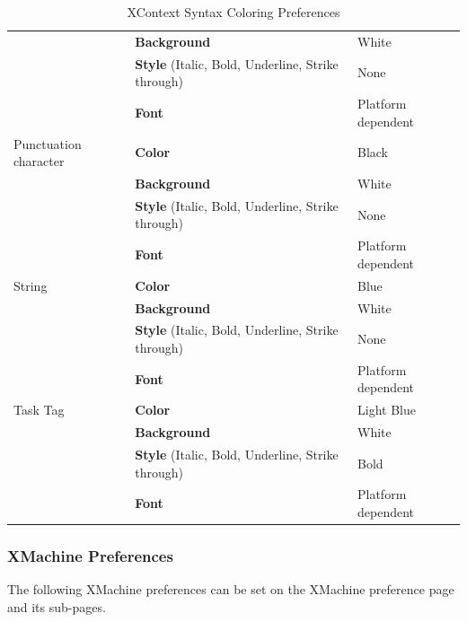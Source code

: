 \begin{table}[!htbp]
\begin{tabular}{|p{}|p{}|p{}|}
                                         & \textbf{Background} & White \\
                                         & \textbf{Style} (Italic, Bold, Underline, Strike through) & None \\
                                         & \textbf{Font} & Platform dependent \\
    \hline
    Punctuation character & \textbf{Color} & Black \\
                                         & \textbf{Background} & White \\
                                         & \textbf{Style} (Italic, Bold, Underline, Strike through) & None \\
                                         & \textbf{Font} & Platform dependent \\
    \hline
    String & \textbf{Color} & Blue \\
                                         & \textbf{Background} & White \\
                                         & \textbf{Style} (Italic, Bold, Underline, Strike through) & None \\
                                         & \textbf{Font} & Platform dependent \\
    \hline
    Task Tag & \textbf{Color} & Light Blue \\
                                         & \textbf{Background} & White \\
                                         & \textbf{Style} (Italic, Bold, Underline, Strike through) & Bold \\
                                         & \textbf{Font} & Platform dependent \\
    \hline
  \end{tabular}
  \caption{XContext Syntax Coloring Preferences}
  \label{tab:xcontext-syntax-coloring-preference}
\end{table}


\subsubsection{XMachine Preferences}
\label{sec:xmachine-preferences}
The following XMachine preferences can be set on the  XMachine preference page and its sub-pages.

